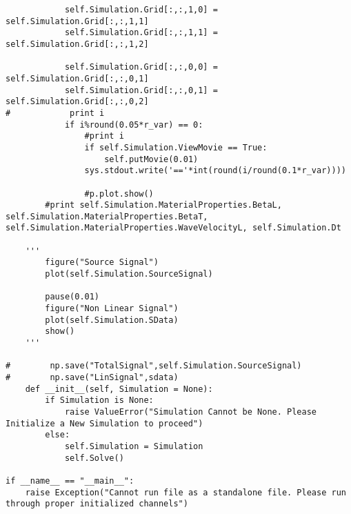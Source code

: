 \begin{lstlisting}
            self.Simulation.Grid[:,:,1,0] = self.Simulation.Grid[:,:,1,1]
            self.Simulation.Grid[:,:,1,1] =  self.Simulation.Grid[:,:,1,2]
            
            self.Simulation.Grid[:,:,0,0] = self.Simulation.Grid[:,:,0,1]
            self.Simulation.Grid[:,:,0,1] =  self.Simulation.Grid[:,:,0,2]
#            print i
            if i%round(0.05*r_var) == 0:
                #print i
                if self.Simulation.ViewMovie == True:
                    self.putMovie(0.01)    
                sys.stdout.write('=='*int(round(i/round(0.1*r_var))))
                
                #p.plot.show()
        #print self.Simulation.MaterialProperties.BetaL, self.Simulation.MaterialProperties.BetaT, self.Simulation.MaterialProperties.WaveVelocityL, self.Simulation.Dt
        
    '''
        figure("Source Signal")
        plot(self.Simulation.SourceSignal)

        pause(0.01) 
        figure("Non Linear Signal")
        plot(self.Simulation.SData)
        show()
    '''
        
#        np.save("TotalSignal",self.Simulation.SourceSignal) 
#        np.save("LinSignal",sdata)
    def __init__(self, Simulation = None):
        if Simulation is None:
            raise ValueError("Simulation Cannot be None. Please Initialize a New Simulation to proceed")
        else:
            self.Simulation = Simulation  
            self.Solve()

if __name__ == "__main__":
    raise Exception("Cannot run file as a standalone file. Please run through proper initialized channels")
\end{lstlisting}
